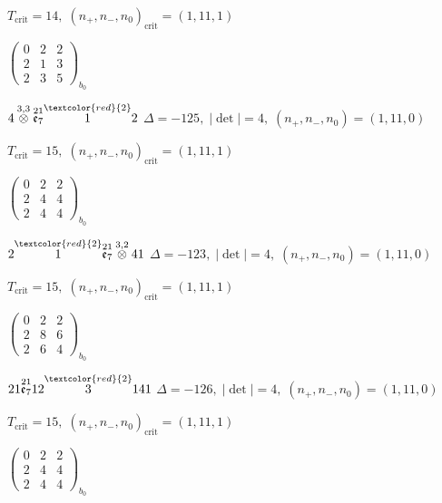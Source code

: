 \documentclass[10pt]{article}
\begin{document}
\hspace{1em}$T_{\text{crit}}=14,\; (n_+,n_-,n_0)_{\text{crit}}=(1,11,1)$

\hspace{2em}$\left(\begin{smallmatrix}0 & 2 & 2 \\ 2 & 1 & 3 \\ 2 & 3 & 5\end{smallmatrix}\right)_{\!b_0}$

\smallskip

$4\overset{3,3}{\otimes}\overset{21}{\mathfrak{e}_7}\overset{\textcolor{red}{2}}{1}2$ \quad $\Delta=-125,\; |\det|=4,\; (n_+,n_-,n_0)=(1,11,0)$

\hspace{1em}$T_{\text{crit}}=15,\; (n_+,n_-,n_0)_{\text{crit}}=(1,11,1)$

\hspace{2em}$\left(\begin{smallmatrix}0 & 2 & 2 \\ 2 & 4 & 4 \\ 2 & 4 & 4\end{smallmatrix}\right)_{\!b_0}$

\smallskip

$2\overset{\textcolor{red}{2}}{1}\overset{21}{\mathfrak{e}_7}\overset{3,2}{\otimes}41$ \quad $\Delta=-123,\; |\det|=4,\; (n_+,n_-,n_0)=(1,11,0)$

\hspace{1em}$T_{\text{crit}}=15,\; (n_+,n_-,n_0)_{\text{crit}}=(1,11,1)$

\hspace{2em}$\left(\begin{smallmatrix}0 & 2 & 2 \\ 2 & 8 & 6 \\ 2 & 6 & 4\end{smallmatrix}\right)_{\!b_0}$

$21\overset{21}{\mathfrak{e}_7}12\overset{\textcolor{red}{2}}{3}141$ \quad $\Delta=-126,\; |\det|=4,\; (n_+,n_-,n_0)=(1,11,0)$

\hspace{1em}$T_{\text{crit}}=15,\; (n_+,n_-,n_0)_{\text{crit}}=(1,11,1)$

\hspace{2em}$\left(\begin{smallmatrix}0 & 2 & 2 \\ 2 & 4 & 4 \\ 2 & 4 & 4\end{smallmatrix}\right)_{\!b_0}$
\end{document}
